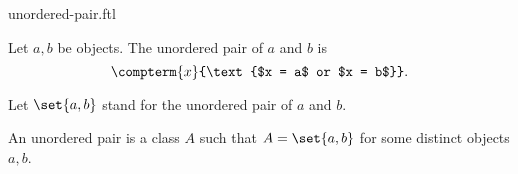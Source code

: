 \documentclass{article}
\begin{document}
\begin{smodule}{unordered-pair.ftl}

  \begin{fdefinition*}[label=3471035364016128]
    Let $a, b$ be objects.
    The unordered pair of $a$ and $b$ is
    \[\compterm{x}{\text{$x = a$ or $x = b$}}.\]
  \end{fdefinition*}

  \begin{fconvention*}
    Let $\set{a,b}$ stand for the unordered pair of $a$ and $b$.
  \end{fconvention*}

  \begin{fdefinition*}[label=605432672419840]
    An unordered pair is a class $A$ such that $A = \set{a,b}$ for some distinct objects $a, b$.
  \end{fdefinition*}
\end{smodule}
\end{document}
